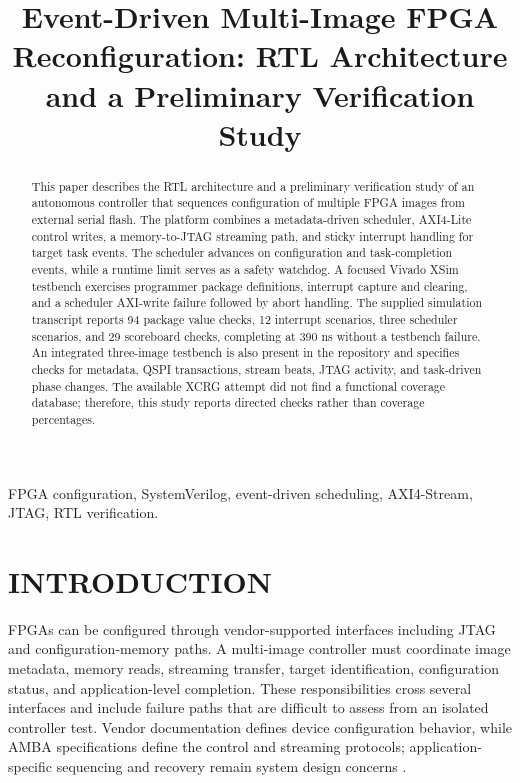 \documentclass[conference]{IEEEtran}
\begin{document}
\title{Event-Driven Multi-Image FPGA Reconfiguration: RTL Architecture and a Preliminary Verification Study}

\author{}

\maketitle

\begin{abstract}

This paper describes the RTL architecture and a preliminary verification study of an autonomous controller that sequences configuration of multiple FPGA images from external serial flash. The platform combines a metadata-driven scheduler, AXI4-Lite control writes, a memory-to-JTAG streaming path, and sticky interrupt handling for target task events. The scheduler advances on configuration and task-completion events, while a runtime limit serves as a safety watchdog. A focused Vivado XSim testbench exercises programmer package definitions, interrupt capture and clearing, and a scheduler AXI-write failure followed by abort handling. The supplied simulation transcript reports 94 package value checks, 12 interrupt scenarios, three scheduler scenarios, and 29 scoreboard checks, completing at 390 ns without a testbench failure. An integrated three-image testbench is also present in the repository and specifies checks for metadata, QSPI transactions, stream beats, JTAG activity, and task-driven phase changes. The available XCRG attempt did not find a functional coverage database; therefore, this study reports directed checks rather than coverage percentages.

\end{abstract}

\begin{IEEEkeywords}FPGA configuration, SystemVerilog, event-driven scheduling, AXI4-Stream, JTAG, RTL verification.\end{IEEEkeywords}

\section{INTRODUCTION}

FPGAs can be configured through vendor-supported interfaces including JTAG and configuration-memory paths. A multi-image controller must coordinate image metadata, memory reads, streaming transfer, target identification, configuration status, and application-level completion. These responsibilities cross several interfaces and include failure paths that are difficult to assess from an isolated controller test. Vendor documentation defines device configuration behavior, while AMBA specifications define the control and streaming protocols; application-specific sequencing and recovery remain system design concerns \cite{1,2}.
\end{document}
